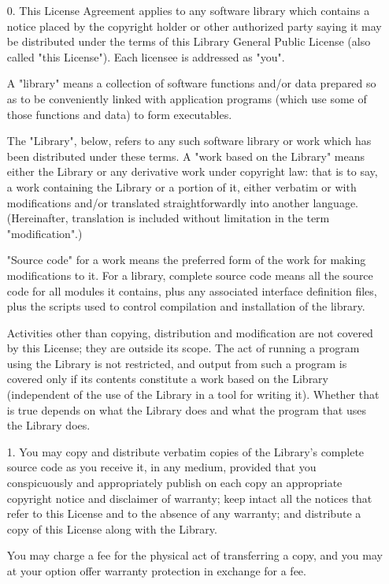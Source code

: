 \begin{itemize}
\item[0.] 
  This License Agreement applies to any software library which
contains a notice placed by the copyright holder or other authorized
party saying it may be distributed under the terms of this Library
General Public License (also called "this License").  Each licensee is
addressed as "you".

  A "library" means a collection of software functions and/or data
prepared so as to be conveniently linked with application programs
(which use some of those functions and data) to form executables.

  The "Library", below, refers to any such software library or work
which has been distributed under these terms.  A "work based on the
Library" means either the Library or any derivative work under
copyright law: that is to say, a work containing the Library or a
portion of it, either verbatim or with modifications and/or translated
straightforwardly into another language.  (Hereinafter, translation is
included without limitation in the term "modification".)

  "Source code" for a work means the preferred form of the work for
making modifications to it.  For a library, complete source code means
all the source code for all modules it contains, plus any associated
interface definition files, plus the scripts used to control compilation
and installation of the library.

  Activities other than copying, distribution and modification are not
covered by this License; they are outside its scope.  The act of
running a program using the Library is not restricted, and output from
such a program is covered only if its contents constitute a work based
on the Library (independent of the use of the Library in a tool for
writing it).  Whether that is true depends on what the Library does
and what the program that uses the Library does.
  
\item[1.] 
   You may copy and distribute verbatim copies of the Library's
complete source code as you receive it, in any medium, provided that
you conspicuously and appropriately publish on each copy an
appropriate copyright notice and disclaimer of warranty; keep intact
all the notices that refer to this License and to the absence of any
warranty; and distribute a copy of this License along with the
Library.

  You may charge a fee for the physical act of transferring a copy,
and you may at your option offer warranty protection in exchange for a
fee.


\end{itemize}
